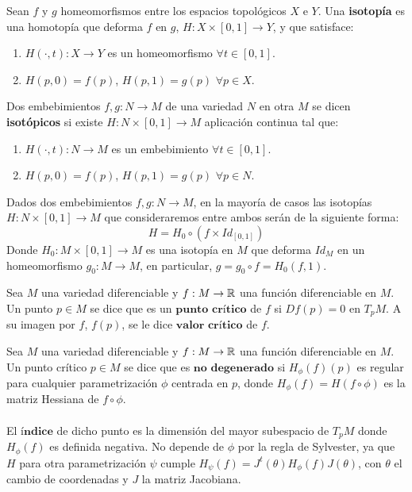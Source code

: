 \begin{definicion} Sean $f$ y $g$ homeomorfismos entre los espacios topológicos $X$ e $Y$. Una \textbf{isotopía} es una homotopía que deforma $f$ en $g$, $H: X \times [0,1] \rightarrow Y$, y que satisface:
	\begin{enumerate}
		\item $H(\cdot, t) : X \rightarrow Y$ es un homeomorfismo $\forall t \in [0,1]$.
		\item $H(p, 0) = f(p)$, $H(p, 1) = g(p)$ $\forall p \in X$.
	\end{enumerate}
\end{definicion}

\begin{definicion} Dos embebimientos $f,g : N \rightarrow M$ de una variedad $N$ en otra $M$ se dicen \textbf{isotópicos} si existe $H: N \times [0,1] \rightarrow M$ aplicación continua tal que:
	\begin{enumerate}
		\item $H(\cdot, t) : N \rightarrow M$ es un embebimiento $\forall t \in [0,1]$.
		\item $H(p, 0) = f(p)$, $H(p, 1) = g(p)$ $\forall p \in N$.
	\end{enumerate}
Dados dos embebimientos $f,g : N \rightarrow M$, en la mayoría de casos las isotopías $H: N \times [0,1] \rightarrow M$ que consideraremos entre ambos serán de la siguiente forma:
$$H=H_0 \circ (f \times Id_{[0,1]})$$
Donde $H_0: M \times [0,1] \rightarrow M$ es una isotopía en $M$ que deforma $Id_M$ en un homeomorfismo $g_0: M \to M$, en particular, $g=g_0 \circ f = H_0(f,1)$.
\end{definicion}

\begin{definicion} Sea $M$ una variedad diferenciable y $f: M \rightarrow \mathbb{R}$ una función diferenciable en $M$. Un punto $p \in M$ se dice que es un $\textbf{punto crítico}$ de $f$ si $Df(p) = 0$ en $T_pM$. A su imagen por $f$, $f(p)$, se le dice $\textbf{valor crítico}$ de $f$.
\end{definicion}

\begin{definicion} Sea $M$ una variedad diferenciable y $f: M \rightarrow \mathbb{R}$ una función diferenciable en $M$. Un punto crítico $p \in M$ se dice que es $\textbf{no degenerado}$ si $H_\phi(f)(p)$ es regular para cualquier parametrización $\phi$ centrada en $p$, donde $H_\phi(f)=H(f \circ \phi)$ es la matriz Hessiana de $f \circ \phi$.\\ 
\\ El $\textbf{índice}$ de dicho punto es la dimensión del mayor subespacio de $T_pM$ donde $H_\phi(f)$ es definida negativa. No depende de $\phi$ por la regla de Sylvester, ya que $H$ para otra parametrización $\psi$ cumple $H_\psi(f) = J^t(\theta) H_\phi(f) J(\theta)$, con $\theta$ el cambio de coordenadas y $J$ la matriz Jacobiana.
\end{definicion}


